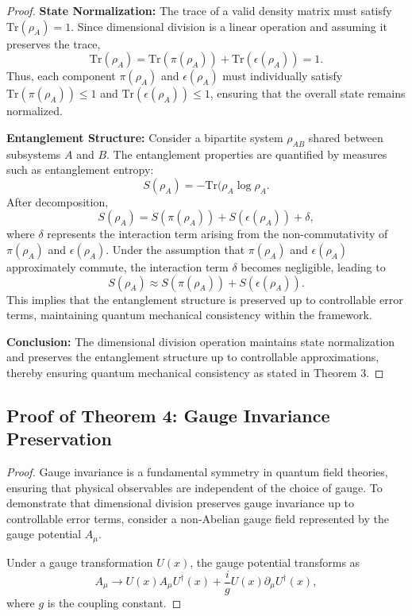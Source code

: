\documentclass[sn-mathphys-num]{sn-jnl}
\theoremstyle{thmstyleone}
\theoremstyle{thmstyletwo}
\theoremstyle{thmstylethree}
\begin{document}
\begin{appendices}
\begin{proof}
\textbf{State Normalization:}
The trace of a valid density matrix must satisfy \( \text{Tr}(\rho_A) = 1 \). Since dimensional division is a linear operation and assuming it preserves the trace,
\[
\text{Tr}(\rho_A) = \text{Tr}(\pi(\rho_A)) + \text{Tr}(\epsilon(\rho_A)) = 1.
\]
Thus, each component \( \pi(\rho_A) \) and \( \epsilon(\rho_A) \) must individually satisfy \( \text{Tr}(\pi(\rho_A)) \leq 1 \) and \( \text{Tr}(\epsilon(\rho_A)) \leq 1 \), ensuring that the overall state remains normalized.

\textbf{Entanglement Structure:}
Consider a bipartite system \( \rho_{AB} \) shared between subsystems \( A \) and \( B \). The entanglement properties are quantified by measures such as entanglement entropy:
\[
S(\rho_A) = -\text{Tr}(\rho_A \log \rho_A.
\]
After decomposition,
\[
S(\rho_A) = S(\pi(\rho_A)) + S(\epsilon(\rho_A)) + \delta,
\]
where \( \delta \) represents the interaction term arising from the non-commutativity of \( \pi(\rho_A) \) and \( \epsilon(\rho_A) \). Under the assumption that \( \pi(\rho_A) \) and \( \epsilon(\rho_A) \) approximately commute, the interaction term \( \delta \) becomes negligible, leading to
\[
S(\rho_A) \approx S(\pi(\rho_A)) + S(\epsilon(\rho_A)).
\]
This implies that the entanglement structure is preserved up to controllable error terms, maintaining quantum mechanical consistency within the framework.

\textbf{Conclusion:}
The dimensional division operation maintains state normalization and preserves the entanglement structure up to controllable approximations, thereby ensuring quantum mechanical consistency as stated in Theorem 3.
\end{proof}

\subsection{Proof of Theorem 4: Gauge Invariance Preservation}\label{proof:theorem4}

\begin{proof}
Gauge invariance is a fundamental symmetry in quantum field theories, ensuring that physical observables are independent of the choice of gauge. To demonstrate that dimensional division preserves gauge invariance up to controllable error terms, consider a non-Abelian gauge field represented by the gauge potential \( A_\mu \).

Under a gauge transformation \( U(x) \), the gauge potential transforms as
\[
A_\mu \rightarrow U(x) A_\mu U^\dagger(x) + \frac{i}{g} U(x) \partial_\mu U^\dagger(x),
\]
where \( g \) is the coupling constant.


\end{proof}
\end{appendices}
\end{document}
